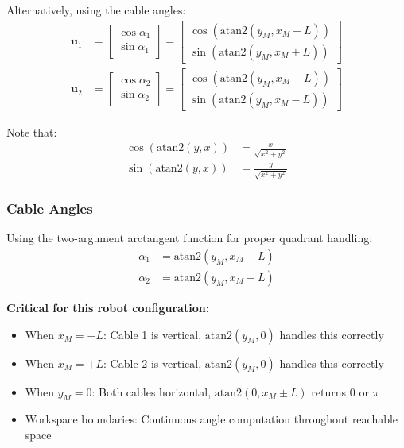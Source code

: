 \documentclass[11pt,a4paper]{article}
\begin{document}
Alternatively, using the cable angles:
\begin{align}
\bm{u}_1 &= \begin{bmatrix} \cos\alpha_1 \\ \sin\alpha_1 \end{bmatrix} = \begin{bmatrix} \cos(\text{atan2}(y_M, x_M + L)) \\ \sin(\text{atan2}(y_M, x_M + L)) \end{bmatrix} \\
\bm{u}_2 &= \begin{bmatrix} \cos\alpha_2 \\ \sin\alpha_2 \end{bmatrix} = \begin{bmatrix} \cos(\text{atan2}(y_M, x_M - L)) \\ \sin(\text{atan2}(y_M, x_M - L)) \end{bmatrix}
\end{align}

Note that:
\begin{align}
\cos(\text{atan2}(y, x)) &= \frac{x}{\sqrt{x^2 + y^2}} \\
\sin(\text{atan2}(y, x)) &= \frac{y}{\sqrt{x^2 + y^2}}
\end{align}

\subsubsection{Cable Angles}
Using the two-argument arctangent function for proper quadrant handling:
\begin{align}
\alpha_1 &= \text{atan2}(y_M, x_M + L) \\
\alpha_2 &= \text{atan2}(y_M, x_M - L)
\end{align}

\textbf{Critical for this robot configuration:}
\begin{itemize}
    \item When $x_M = -L$: Cable 1 is vertical, $\text{atan2}(y_M, 0)$ handles this correctly
    \item When $x_M = +L$: Cable 2 is vertical, $\text{atan2}(y_M, 0)$ handles this correctly  
    \item When $y_M = 0$: Both cables horizontal, $\text{atan2}(0, x_M \pm L)$ returns $0$ or $\pi$
    \item Workspace boundaries: Continuous angle computation throughout reachable space
\end{itemize}
\end{document}
